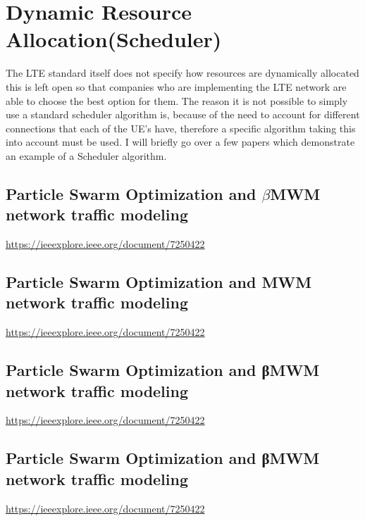 \section{Dynamic Resource Allocation(Scheduler)}
{
	The LTE standard itself does not specify how resources are dynamically allocated this is left open so that companies who are implementing the LTE network are able to choose the best option for them. The reason it is not possible to simply use a standard scheduler algorithm is, because of the need to account for different connections that each of the UE's have, therefore a specific algorithm taking this into account must be used. I will briefly go over a few papers which demonstrate an example of a Scheduler algorithm.
	\subsection{Particle Swarm Optimization and $\beta$MWM network traffic modeling \cite{DRASwarmWthNetwork7250422}}
	{
		\url{https://ieeexplore.ieee.org/document/7250422}
	}

	\subsection{Particle Swarm Optimization and MWM network traffic modeling\cite{DRASwarmWthNetwork7250422}}
	{
		\url{https://ieeexplore.ieee.org/document/7250422}
	}

	\subsection{Particle Swarm Optimization and βMWM network traffic modeling\cite{DRASwarmWthNetwork7250422}}
	{
		\url{https://ieeexplore.ieee.org/document/7250422}
	}
	
	\subsection{Particle Swarm Optimization and βMWM network traffic modeling\cite{DRASwarmWthNetwork7250422}}
	{
		\url{https://ieeexplore.ieee.org/document/7250422}
	}
}